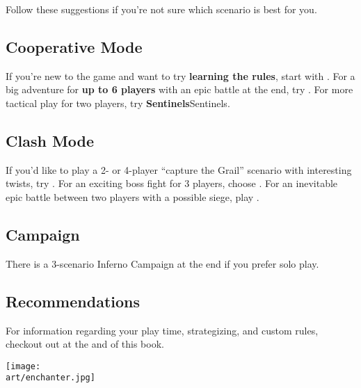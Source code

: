 
\begin{multicols}{2}

Follow these suggestions if you're not sure which scenario is best for you.

\subsection*{Cooperative Mode}

If you're new to the game and want to try \textbf{learning the rules}, start with .
For a big adventure for \textbf{up to 6 players} with an epic battle at the end, try .
For more tactical play for two players, try \textbf{Sentinels}{Sentinels}.

\subsection*{Clash Mode}

If you'd like to play a 2- or 4-player ``capture the Grail'' scenario with interesting twists, try .
For an exciting boss fight for 3 players, choose .
For an inevitable epic battle between two players with a possible siege, play .

\subsection*{Campaign}

There is a 3-scenario Inferno  Campaign at the end if you prefer solo play.

\subsection*{Recommendations}

For information regarding your play time, strategizing, and custom rules, checkout out  at the and of this book.

\end{multicols}

\texttt{[image: \\art/enchanter.jpg]}
